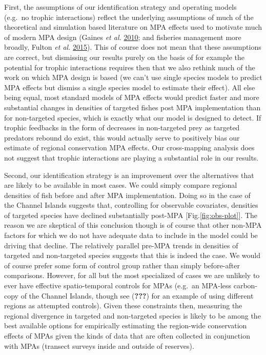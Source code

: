 \documentclass[twoside,12pt,final]{ucthesis-CA2012}
\begin{document}
\begin{ucmainmatter}
First, the assumptions of our identification strategy and operating
models (e.g.~no trophic interactions) reflect the underlying assumptions
of much of the theoretical and simulation based literature on MPA
effects used to motivate much of modern MPA design (Gaines \emph{et al.}
\protect\hyperlink{ref-Gaines2010}{2010}; and fisheries management more
broadly, Fulton \emph{et al.} \protect\hyperlink{ref-Fulton2015}{2015}).
This of course does not mean that these assumptions are correct, but
dismissing our results purely on the basis of for example the potential
for trophic interactions requires then that we also rethink much of the
work on which MPA design is based (we can't use single species models to
predict MPA effects but dismiss a single species model to estimate their
effect). All else being equal, most standard models of MPA effects would
predict faster and more substantial changes in densities of targeted
fishes post MPA implementation than for non-targeted species, which is
exactly what our model is designed to detect. If trophic feedbacks in
the form of decreases in non-targeted prey as targeted predators rebound
do exist, this would actually serve to positively bias our estimate of
regional conservation MPA effects. Our cross-mapping analysis does not
suggest that trophic interactions are playing a substantial role in our
results.

Second, our identification strategy is an improvement over the
alternatives that are likely to be available in most cases. We could
simply compare regional densities of fish before and after MPA
implementation. Doing so in the case of the Channel Islands suggests
that, controlling for observable covariates, densities of targeted
species have declined substantially post-MPA
{[}Fig.\ref{fig:obs-plot}{]}. The reason we are skeptical of this
conclusion though is of course that other non-MPA factors for which we
do not have adequate data to include in the model could be driving that
decline. The relatively parallel pre-MPA trends in densities of targeted
and non-targeted species suggests that this is indeed the case. We would
of course prefer some form of control group rather than simply
before-after comparisons. However, for all but the most specialized of
cases we are unlikely to ever have effective spatio-temporal controls
for MPAs (e.g.~an MPA-less carbon-copy of the Channel Islands, though
see ({\textbf{???}}) for an example of using different regions as
attempted controls). Given these constraints then, measuring the
regional divergence in targeted and non-targeted species is likely to be
among the best available options for empirically estimating the
region-wide conservation effects of MPAs given the kinds of data that
are often collected in conjunction with MPAs (transect surveys inside
and outside of reserves).


\end{ucmainmatter}
\end{document}
